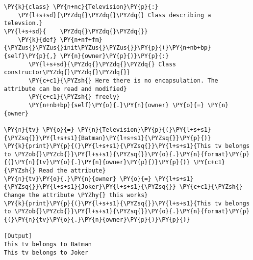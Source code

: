 \begin{Verbatim}[label=\makebox{\url{https://bitbucket.org/lbaldini/programming/src/tip/snippets/class\_tv\_encapsulation\_none.py}},commandchars=\\\{\}]
\PY{k}{class} \PY{n+nc}{Television}\PY{p}{:}
    \PY{l+s+sd}{\PYZdq{}\PYZdq{}\PYZdq{} Class describing a televsion.}
\PY{l+s+sd}{    \PYZdq{}\PYZdq{}\PYZdq{}}
    \PY{k}{def} \PY{n+nf+fm}{\PYZus{}\PYZus{}init\PYZus{}\PYZus{}}\PY{p}{(}\PY{n+nb+bp}{self}\PY{p}{,} \PY{n}{owner}\PY{p}{)}\PY{p}{:}
       \PY{l+s+sd}{\PYZdq{}\PYZdq{}\PYZdq{} Class constructor\PYZdq{}\PYZdq{}\PYZdq{}}
       \PY{c+c1}{\PYZsh{} Here there is no encapsulation. The attribute can be read and modified}
       \PY{c+c1}{\PYZsh{} freely}
       \PY{n+nb+bp}{self}\PY{o}{.}\PY{n}{owner} \PY{o}{=} \PY{n}{owner}
       
\PY{n}{tv} \PY{o}{=} \PY{n}{Television}\PY{p}{(}\PY{l+s+s1}{\PYZsq{}}\PY{l+s+s1}{Batman}\PY{l+s+s1}{\PYZsq{}}\PY{p}{)}
\PY{k}{print}\PY{p}{(}\PY{l+s+s1}{\PYZsq{}}\PY{l+s+s1}{This tv belongs to \PYZob{}\PYZcb{}}\PY{l+s+s1}{\PYZsq{}}\PY{o}{.}\PY{n}{format}\PY{p}{(}\PY{n}{tv}\PY{o}{.}\PY{n}{owner}\PY{p}{)}\PY{p}{)} \PY{c+c1}{\PYZsh{} Read the attribute}
\PY{n}{tv}\PY{o}{.}\PY{n}{owner} \PY{o}{=} \PY{l+s+s1}{\PYZsq{}}\PY{l+s+s1}{Joker}\PY{l+s+s1}{\PYZsq{}} \PY{c+c1}{\PYZsh{} Change the attribute \PYZhy{} this works}
\PY{k}{print}\PY{p}{(}\PY{l+s+s1}{\PYZsq{}}\PY{l+s+s1}{This tv belongs to \PYZob{}\PYZcb{}}\PY{l+s+s1}{\PYZsq{}}\PY{o}{.}\PY{n}{format}\PY{p}{(}\PY{n}{tv}\PY{o}{.}\PY{n}{owner}\PY{p}{)}\PY{p}{)}

[Output]
This tv belongs to Batman
This tv belongs to Joker
\end{Verbatim}